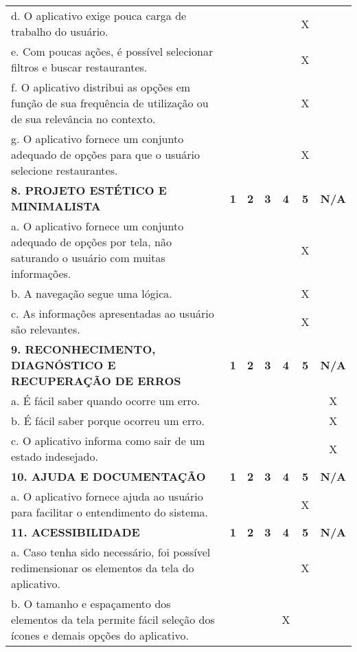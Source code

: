 \documentclass[portuguese,oneside]{tcc}
\begin{document}
\begin{center}
\begin{longtabu}{|L{25em}|c|c|c|c|c|c|}
			d. O aplicativo exige pouca carga de trabalho do usuário. & & & & & X & \\ 
			e. Com poucas ações, é possível selecionar filtros e buscar restaurantes. & & & & & X & \\ 
			f. O aplicativo distribui as opções em função de sua frequência de utilização ou de sua relevância no contexto.	& & & & & X & \\ 
			g. O aplicativo fornece um conjunto adequado de opções para que o usuário selecione restaurantes. & & & & & X & \\ 
			\textbf{8. PROJETO ESTÉTICO E MINIMALISTA} & \textbf{1} & \textbf{2} & \textbf{3} & \textbf{4} & \textbf{5} & \textbf{N/A} \\ 
			a. O aplicativo fornece um conjunto adequado de opções por tela, não saturando o usuário com muitas informações. & & & & & X & \\ 
			b. A navegação segue uma lógica. & & & & & X & \\ 
			c. As informações apresentadas ao usuário são relevantes. & & & & & X & \\ 
			\textbf{9. RECONHECIMENTO, DIAGNÓSTICO E RECUPERAÇÃO DE ERROS} & \textbf{1} & \textbf{2} & \textbf{3} & \textbf{4} & \textbf{5} & \textbf{N/A} \\ 
			a. É fácil saber quando ocorre um erro.	& & & & & & X \\ 
			b. É fácil saber porque ocorreu um erro. & & & & & & X \\ 
			c. O aplicativo informa como sair de um estado indesejado. & & & & & & X \\ 
			\textbf{10. AJUDA E DOCUMENTAÇÃO} & \textbf{1} & \textbf{2} & \textbf{3} & \textbf{4} & \textbf{5} & \textbf{N/A} \\ 
			a. O aplicativo fornece ajuda ao usuário para facilitar o entendimento do sistema. & & & & & X & \\ 
			\textbf{11. ACESSIBILIDADE} & \textbf{1} & \textbf{2} & \textbf{3} & \textbf{4} & \textbf{5} & \textbf{N/A} \\ 
			a. Caso tenha sido necessário, foi possível redimensionar os elementos da tela do aplicativo. & & & & & X & \\ 
			b. O tamanho e espaçamento dos elementos da tela permite fácil seleção dos ícones e demais opções do aplicativo. & & & & X & & \\ 

\end{longtabu}
\end{center}
\end{document}
